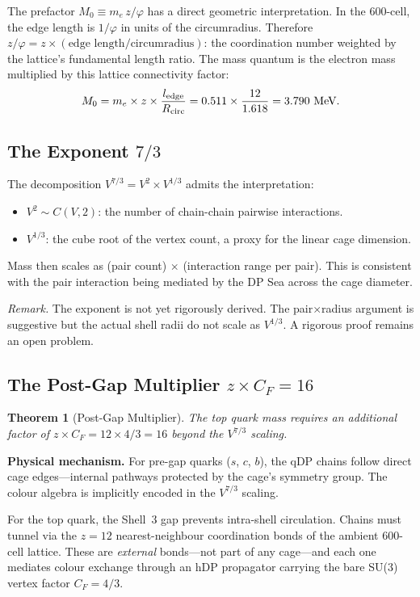 \documentclass[11pt,letterpaper]{article}
\newtheorem{theorem}{Theorem}[section]
\newcommand{\phig}{\varphi}
\begin{document}
The prefactor $M_0 \equiv m_e \, z / \phig$ has a direct geometric
interpretation.  In the 600-cell, the edge length is $1/\phig$ in
units of the circumradius.  Therefore $z/\phig = z \times
(\text{edge length}/\text{circumradius})$: the coordination number
weighted by the lattice's fundamental length ratio.  The mass
quantum is the electron mass multiplied by this lattice connectivity
factor:
\[
  M_0 = m_e \times z \times \frac{l_{\rm edge}}{R_{\rm circ}}
      = 0.511 \times \frac{12}{1.618} = 3.790 \text{~MeV}.
\]

\subsection{The Exponent $7/3$}

The decomposition $V^{7/3} = V^2 \times V^{1/3}$ admits the
interpretation:
\begin{itemize}
\item $V^2 \sim C(V,2)$: the number of chain-chain pairwise
  interactions.
\item $V^{1/3}$: the cube root of the vertex count, a proxy for
  the linear cage dimension.
\end{itemize}
Mass then scales as (pair count) $\times$ (interaction range per
pair).  This is consistent with the pair interaction being mediated
by the DP Sea across the cage diameter.

\textit{Remark.} The exponent is not yet rigorously derived.  The
pair$\times$radius argument is suggestive but the actual shell
radii do not scale as $V^{1/3}$.  A rigorous proof remains an open
problem.

\subsection{The Post-Gap Multiplier $z \times C_F = 16$}
\label{sec:top-boost}

\begin{theorem}[Post-Gap Multiplier]
\label{thm:postgap}
The top quark mass requires an additional factor of $z \times C_F =
12 \times 4/3 = 16$ beyond the $V^{7/3}$ scaling.
\end{theorem}

\noindent
\textbf{Physical mechanism.}
For pre-gap quarks ($s$, $c$, $b$), the qDP chains follow direct
cage edges---internal pathways protected by the cage's symmetry
group.  The colour algebra is implicitly encoded in the $V^{7/3}$
scaling.

For the top quark, the Shell~3 gap prevents intra-shell circulation.
Chains must tunnel via the $z\!=\!12$ nearest-neighbour coordination
bonds of the ambient 600-cell lattice.  These are \emph{external}
bonds---not part of any cage---and each one mediates colour exchange
through an hDP propagator carrying the bare SU(3) vertex factor
$C_F = 4/3$.
\end{document}

